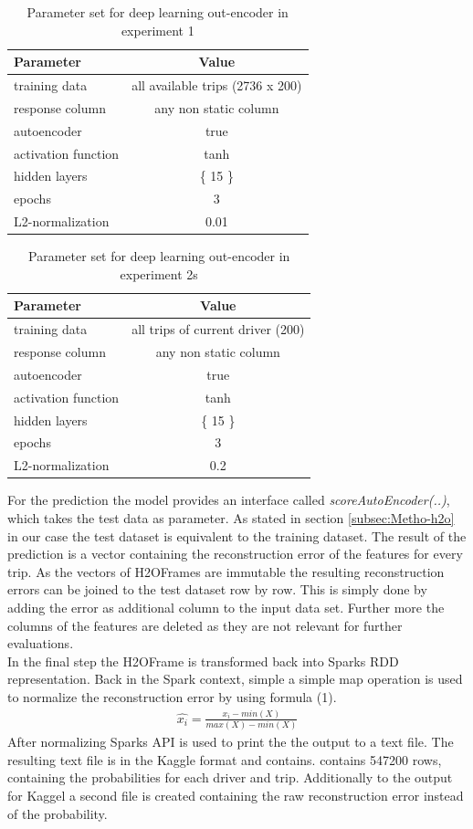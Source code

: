 \documentclass{vldb}
\begin{document}
\begin{table}
\centering
\begin{tabular}{l | c}
Parameter            & Value\\ \hline
training data        & all available trips (2736 x 200) \\
response column      & any non static column \\
autoencoder          & true \\
activation function  & tanh \\
hidden layers        & \{ 15 \}\\
epochs               & 3\\
L2-normalization     & 0.01
\end{tabular}
\caption{Parameter set for deep learning out-encoder in experiment 1}
\label{table:param-set-exp1}
\end{table}

\begin{table}
\centering
\begin{tabular}{l | c}
Parameter            & Value\\ \hline
training data        & all trips of current driver (200) \\
response column      & any non static column \\
autoencoder          & true \\
activation function  & tanh \\
hidden layers        & \{ 15 \}\\
epochs               & 3\\
L2-normalization     & 0.2
\end{tabular}
\caption{Parameter set for deep learning out-encoder in experiment 2s}
\label{table:param-set-exp2}
\end{table}

For the prediction the model provides an interface called \textit{scoreAutoEncoder(..)}, which takes the test data as parameter. As stated in section \ref{subsec:Metho-h2o} in our case the test dataset is equivalent to the training dataset. The result of the prediction is a vector containing the reconstruction error of the features for every trip. As the vectors of H2OFrames are immutable the resulting reconstruction errors can be joined to the test dataset row by row. This is simply done by adding the error as additional column to the input data set. Further more the columns of the features are deleted as they are not relevant for further evaluations. \\
In the final step the H2OFrame is transformed back into Sparks RDD representation. Back in the Spark context, simple a simple map operation is used to  normalize the reconstruction error by using formula (1).
\begin{align}
\hat{x_i} = \frac{x_i - min(X)}{max(X) - min(X)}
\end{align}
After normalizing Sparks API is used to print the the output to a text file. The resulting text file is in the Kaggle format and contains. contains 547200 rows, containing the probabilities for each driver and trip. Additionally to the output for Kaggel a second file is created containing the raw reconstruction error instead of the probability.
\end{document}
